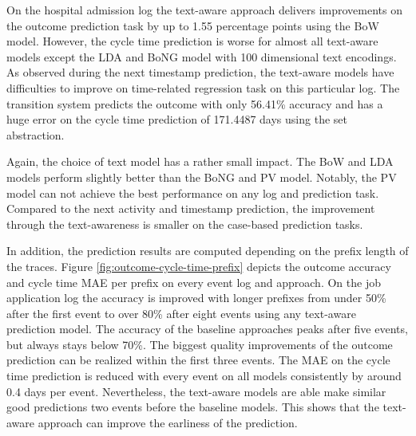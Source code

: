 On the hospital admission log the text-aware approach delivers improvements on the outcome prediction task by up to 1.55 percentage points using the BoW model.
However, the cycle time prediction is worse for almost all text-aware models except the LDA and BoNG model with 100 dimensional text encodings.
As observed during the next timestamp prediction, the text-aware models have difficulties to improve on time-related regression task on this particular log.
The transition system predicts the outcome with only 56.41\% accuracy and has a huge error on the cycle time prediction of 171.4487 days using the set abstraction.

Again, the choice of text model has a rather small impact.
The BoW and LDA models perform slightly better than the BoNG and PV model.
Notably, the PV model can not achieve the best performance on any log and prediction task.
Compared to the next activity and timestamp prediction, the improvement through the text-awareness is smaller on the case-based prediction tasks.

In addition, the prediction results are computed depending on the prefix length of the traces.
Figure \ref{fig:outcome-cycle-time-prefix} depicts the outcome accuracy and cycle time MAE per prefix on every event log and approach.
On the job application log the accuracy is improved with longer prefixes from under 50\% after the first event to over 80\% after eight events using any text-aware prediction model.
The accuracy of the baseline approaches peaks after five events, but always stays below 70\%.
The biggest quality improvements of the outcome prediction can be realized within the first three events.
The MAE on the cycle time prediction is reduced with every event on all models consistently by around 0.4 days per event.
Nevertheless, the text-aware models are able make similar good predictions two events before the baseline models.
This shows that the text-aware approach can improve the earliness of the prediction.

